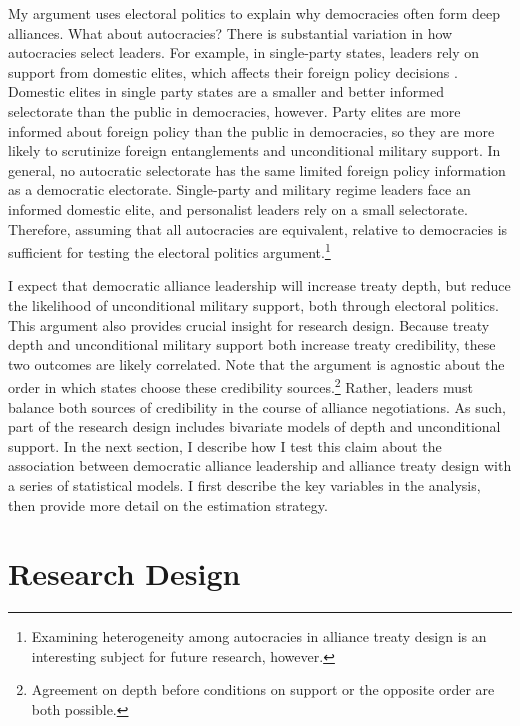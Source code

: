 \documentclass[12pt]{article}
\begin{document}
My argument uses electoral politics to explain why democracies often form deep alliances. 
What about autocracies? 
There is substantial variation in how autocracies select leaders. 
For example, in single-party states, leaders rely on support from domestic elites, which affects their foreign policy decisions \citep{Weeks2014}.
Domestic elites in single party states are a smaller and better informed selectorate than the public in democracies, however.  
Party elites are more informed about foreign policy than the public in democracies, so they are more likely to scrutinize foreign entanglements and unconditional military support. 
In general, no autocratic selectorate has the same limited foreign policy information as a democratic electorate.
Single-party and military regime leaders face an informed domestic elite, and personalist leaders rely on a small selectorate. 
Therefore, assuming that all autocracies are equivalent, relative to democracies is sufficient for testing the electoral politics argument.\footnote{Examining heterogeneity among autocracies in alliance treaty design is an interesting subject for future research, however.} 


I expect that democratic alliance leadership will increase treaty depth, but reduce the likelihood of unconditional military support, both through electoral politics. 
This argument also provides crucial insight for research design. 
Because treaty depth and unconditional military support both increase treaty credibility, these two outcomes are likely correlated.
Note that the argument is agnostic about the order in which states choose these credibility sources.\footnote{Agreement on depth before conditions on support or the opposite order are both possible.}
Rather, leaders must balance both sources of credibility in the course of alliance negotiations. 
As such, part of the research design includes bivariate models of depth and unconditional support. 
In the next section, I describe how I test this claim about the association between democratic alliance leadership and alliance treaty design with a series of statistical models. 
I first describe the key variables in the analysis, then provide more detail on the estimation strategy.



\section{Research Design}
\end{document}
